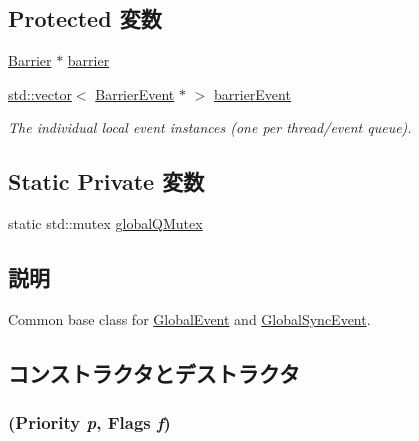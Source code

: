 \subsection*{Protected 変数}
\begin{DoxyCompactItemize}
\item 
\hyperlink{classBarrier}{Barrier} $\ast$ \hyperlink{classBaseGlobalEvent_aa7d3601dfe4f1448143811e57bd9ca46}{barrier}
\item 
\hyperlink{classstd_1_1vector}{std::vector}$<$ \hyperlink{classBaseGlobalEvent_1_1BarrierEvent}{BarrierEvent} $\ast$ $>$ \hyperlink{classBaseGlobalEvent_a40d3227f068698be5d711619183aedb5}{barrierEvent}
\begin{DoxyCompactList}\small\item\em The individual local event instances (one per thread/event queue). \item\end{DoxyCompactList}\end{DoxyCompactItemize}
\subsection*{Static Private 変数}
\begin{DoxyCompactItemize}
\item 
static std::mutex \hyperlink{classBaseGlobalEvent_ab8876bd0359e5a02d1d6abe4b489c9cc}{globalQMutex}
\end{DoxyCompactItemize}


\subsection{説明}
Common base class for \hyperlink{classGlobalEvent}{GlobalEvent} and \hyperlink{classGlobalSyncEvent}{GlobalSyncEvent}. 

\subsection{コンストラクタとデストラクタ}
\hypertarget{classBaseGlobalEvent_adb528c92040920c5f2c51468230da763}{
\subsubsection[{BaseGlobalEvent}]{ ({\bf Priority} {\em p}, \/  {\bf Flags} {\em f})}}
\label{classBaseGlobalEvent_adb528c92040920c5f2c51468230da763}



